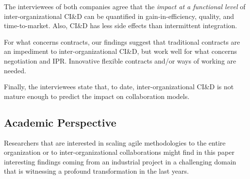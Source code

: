 The interviewees of both companies agree that the {\em impact at a functional level} of inter-organizational CI\&D %
can be quantified in gain-in-efficiency, quality, and time-to-market. Also, CI\&D has less side effects than intermittent integration.%

For what concerns contracts, our findings suggest that traditional contracts are an impediment to inter-organizational CI\&D, but work well for what concerns negotiation and IPR. Innovative flexible contracts and/or ways of working are needed.

Finally, the interviewees state that, to date, inter-organizational CI\&D is not mature enough to predict the impact on collaboration models. 

\subsection{Academic Perspective}\label{sec:research}


Researchers that are interested in scaling agile methodologies to the entire organization or to inter-organizational collaborations might find in this paper interesting findings coming from an industrial project in a challenging domain that is witnessing a profound transformation in the last years. 

